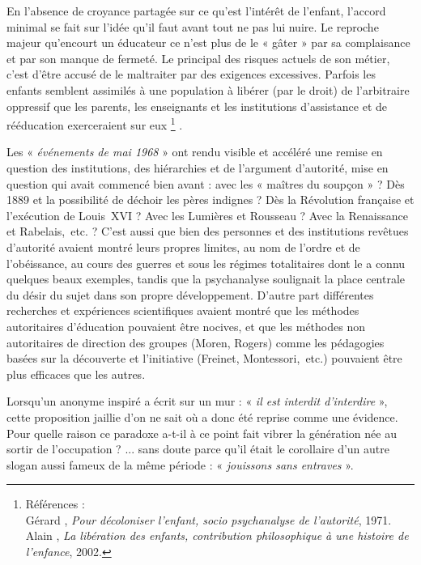 \begin{table}[t]
\begin{table}[t]
 En l'absence de croyance partagée sur ce qu'est l'intérêt de l'enfant, l'accord minimal se fait sur l'idée qu'il faut avant tout ne pas lui nuire. Le reproche majeur qu'encourt un éducateur ce n'est plus de le « gâter » par sa complaisance et par son manque de fermeté. Le principal des risques actuels de son métier, c'est d'être accusé de le maltraiter par des exigences excessives. Parfois les enfants semblent assimilés à une population à libérer (par le droit) de l'arbitraire oppressif que les parents, les enseignants et les institutions d'assistance et de rééducation exerceraient sur eux%
\footnote{Références : 
\\Gérard , \emph{Pour décoloniser l'enfant, socio psychanalyse de l'autorité}, 1971.
\\Alain {}, \emph{La libération des enfants, contribution philosophique à une histoire de l'enfance}, 2002.}%
.

 Les « \emph{événements de mai 1968} » ont rendu visible et accéléré une remise en question des institutions, des hiérarchies et de l'argument d'autorité, mise en question qui avait commencé bien avant : avec les « maîtres du soupçon » ? Dès 1889 et la possibilité de déchoir les pères indignes ? Dès la Révolution française et l'exécution de Louis~XVI ? Avec les Lumières et Rousseau ? Avec la Renaissance et Rabelais,~etc. ? C'est aussi que bien des personnes et des institutions revêtues d'autorité avaient montré leurs propres limites, au nom de l'ordre et de l'obéissance, au cours des guerres et sous les régimes totalitaires dont le  a connu quelques beaux exemples, tandis que la psychanalyse soulignait la place centrale du désir du sujet dans son propre développement. D'autre part différentes recherches et expériences scientifiques avaient montré que les méthodes autoritaires d'éducation pouvaient être nocives, et que les méthodes non autoritaires de direction des groupes (Moren, Rogers) comme les pédagogies basées sur la découverte et l'initiative (Freinet, Montessori,~etc.) pouvaient être plus efficaces que les autres.

 Lorsqu'un anonyme inspiré a écrit sur un mur : « \emph{il est interdit d'interdire} », cette proposition jaillie d'on ne sait où a donc été reprise comme une évidence. Pour quelle raison ce paradoxe a-t-il à ce point fait vibrer la génération née au sortir de l'occupation ? ... sans doute parce qu'il était le corollaire d'un autre slogan aussi fameux de la même période : « \emph{jouissons sans entraves} ». 


\end{table}
\end{table}
